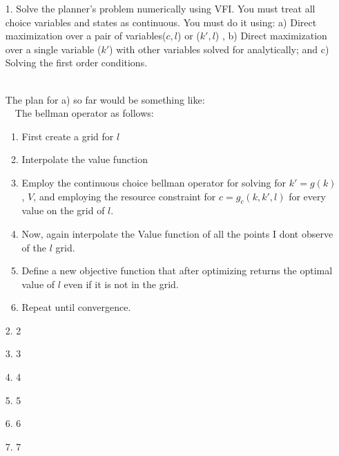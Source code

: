 \documentclass[a4paper]{article}
\begin{document}
\begin{enumerate}
\item[1.] Solve the planner's problem numerically using VFI. You must treat all choice variables and states as continuous. You must do it using: a) Direct maximization over a pair of variables($c,l$) or ($k',l$) , b) Direct maximization over a single variable ($k'$) with other variables solved for analytically; and c) Solving the first order conditions.\\~\

The plan for a) so far would be something like:\\~\
The bellman operator as follows:
\begin{enumerate}
\item First create a grid for $l$
\item Interpolate the value function
\item Employ the continuous choice bellman operator for solving for $k' = g(k)$, $V$, and employing the resource constraint for $c=g_c(k,k',l)$ for every value on the grid of $l$.
\item Now, again interpolate the Value function of all the points I dont observe of the $l$ grid.
\item Define a new objective function that after optimizing returns the optimal value of $l$ even if it is not in the grid.
\item Repeat until convergence.
\end{enumerate}


\item[2.] 2

\item[3.] 3
\item[4.] 4
\item[5.] 5

\item[6.] 6

\item[7.] 7



\end{enumerate}







%
%
\end{document}
